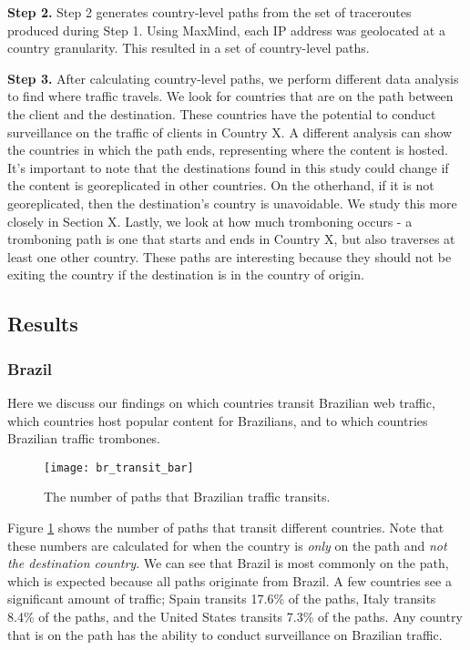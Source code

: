 {\bf Step 2.}  Step 2 generates country-level paths from the set of traceroutes produced during Step 1.  Using MaxMind, each IP address was geolocated at a country granularity.  This resulted in a set of country-level paths.

{\bf Step 3.}  After calculating country-level paths, we perform different data analysis to find where traffic travels.  We look for countries that are on the path between the client and the destination.  These countries have the potential to conduct surveillance on the traffic of clients in Country X.  A different analysis can show the countries in which the path ends, representing where the content is hosted.  It's important to note that the destinations found in this study could change if the content is georeplicated in other countries.  On the otherhand, if it is not georeplicated, then the destination's country is unavoidable.  We study this more closely in Section X.  Lastly, we look at how much tromboning occurs - a tromboning path is one that starts and ends in Country X, but also traverses at least one other country.  These paths are interesting because they should not be exiting the country if the destination is in the country of origin.  

\subsection{Results}

\subsubsection{Brazil}
Here we discuss our findings on which countries transit Brazilian web traffic, which countries host popular content for Brazilians, and to which countries Brazilian traffic trombones.  

\begin{figure}
\centering
\texttt{[image: br\_transit\_bar]}
\caption{The number of paths that Brazilian traffic transits.}
\label{fig:transit}
\end{figure}

Figure \ref{fig:transit} shows the number of paths that transit different countries.  Note that these numbers are calculated for when the country is \textit{only} on the path and \textit{not the destination country}.  We can see that Brazil is most commonly on the path, which is expected because all paths originate from Brazil.  A few countries see a significant amount of traffic; Spain transits 17.6\% of the paths, Italy transits 8.4\% of the paths, and the United States transits 7.3\% of the paths.  Any country that is on the path has the ability to conduct surveillance on Brazilian traffic.  

